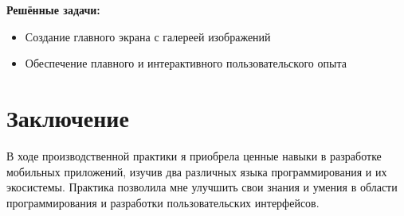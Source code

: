 \documentclass[a4paper, 12pt]{extarticle}
\begin{document}
\textbf{Решённые задачи:}
\begin{itemize}
    \item Создание главного экрана с галереей изображений
    \item Обеспечение плавного и интерактивного пользовательского опыта
\end{itemize}

\section*{Заключение}
В ходе производственной практики я приобрела ценные навыки в разработке мобильных приложений, изучив два различных языка программирования и их экосистемы. Практика позволила мне улучшить свои знания и умения в области программирования и разработки пользовательских интерфейсов.
\end{document}
